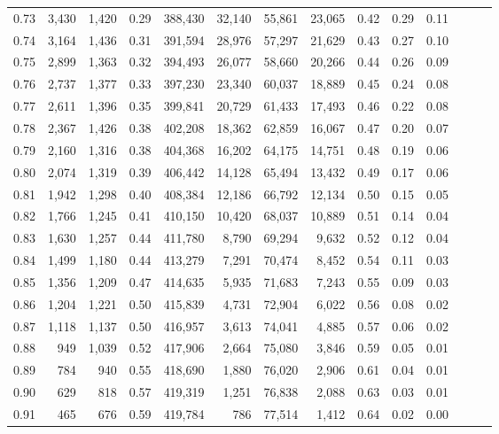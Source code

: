 \begin{tabular}{rrrrrrrrrrrrrr}
0.73 &  3,430 &  1,420 &  0.29 &  388,430 &   32,140 &  55,861 &  23,065 &  0.42 &  0.29 &      0.11 \\
0.74 &  3,164 &  1,436 &  0.31 &  391,594 &   28,976 &  57,297 &  21,629 &  0.43 &  0.27 &      0.10 \\
0.75 &  2,899 &  1,363 &  0.32 &  394,493 &   26,077 &  58,660 &  20,266 &  0.44 &  0.26 &      0.09 \\
0.76 &  2,737 &  1,377 &  0.33 &  397,230 &   23,340 &  60,037 &  18,889 &  0.45 &  0.24 &      0.08 \\
0.77 &  2,611 &  1,396 &  0.35 &  399,841 &   20,729 &  61,433 &  17,493 &  0.46 &  0.22 &      0.08 \\
0.78 &  2,367 &  1,426 &  0.38 &  402,208 &   18,362 &  62,859 &  16,067 &  0.47 &  0.20 &      0.07 \\
0.79 &  2,160 &  1,316 &  0.38 &  404,368 &   16,202 &  64,175 &  14,751 &  0.48 &  0.19 &      0.06 \\
0.80 &  2,074 &  1,319 &  0.39 &  406,442 &   14,128 &  65,494 &  13,432 &  0.49 &  0.17 &      0.06 \\
0.81 &  1,942 &  1,298 &  0.40 &  408,384 &   12,186 &  66,792 &  12,134 &  0.50 &  0.15 &      0.05 \\
0.82 &  1,766 &  1,245 &  0.41 &  410,150 &   10,420 &  68,037 &  10,889 &  0.51 &  0.14 &      0.04 \\
0.83 &  1,630 &  1,257 &  0.44 &  411,780 &    8,790 &  69,294 &   9,632 &  0.52 &  0.12 &      0.04 \\
0.84 &  1,499 &  1,180 &  0.44 &  413,279 &    7,291 &  70,474 &   8,452 &  0.54 &  0.11 &      0.03 \\
0.85 &  1,356 &  1,209 &  0.47 &  414,635 &    5,935 &  71,683 &   7,243 &  0.55 &  0.09 &      0.03 \\
0.86 &  1,204 &  1,221 &  0.50 &  415,839 &    4,731 &  72,904 &   6,022 &  0.56 &  0.08 &      0.02 \\
0.87 &  1,118 &  1,137 &  0.50 &  416,957 &    3,613 &  74,041 &   4,885 &  0.57 &  0.06 &      0.02 \\
0.88 &    949 &  1,039 &  0.52 &  417,906 &    2,664 &  75,080 &   3,846 &  0.59 &  0.05 &      0.01 \\
0.89 &    784 &    940 &  0.55 &  418,690 &    1,880 &  76,020 &   2,906 &  0.61 &  0.04 &      0.01 \\
0.90 &    629 &    818 &  0.57 &  419,319 &    1,251 &  76,838 &   2,088 &  0.63 &  0.03 &      0.01 \\
0.91 &    465 &    676 &  0.59 &  419,784 &      786 &  77,514 &   1,412 &  0.64 &  0.02 &      0.00 \\

\end{tabular}
